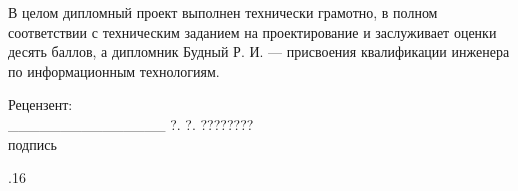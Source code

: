 \documentclass[a4paper,hidelinks,14pt]{extarticle}
\begin{document}
В целом дипломный проект выполнен технически грамотно, в полном соответствии
с техническим заданием на проектирование и заслуживает оценки {\color{red} десять баллов},
а дипломник Будный Р. И. --- присвоения квалификации инженера по информационным технологиям.

\bigskip
\noindent Рецензент: \\
 \_\_\_\_\_\_\_\_\_\_\_\_\_\_\_ {\color{red} ?. ?. ????????} \\
\hspace*{8.5cm} {\small подпись}

.16
\end{document}

